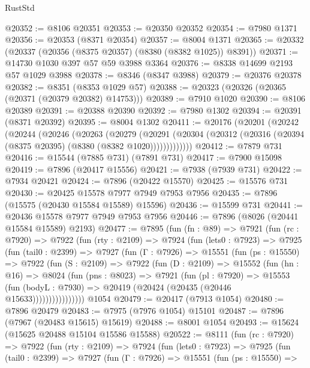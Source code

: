 \begin{lexlean}{RustStd}
\begin{coremodule}
@20352 := @8106 @20351
@20353 := @20350 @20352
@20354 := @7980 @1371
@20356 := @20353 (@8371 @20354)
@20357 := @8004 @1371
@20365 := @20332 (@20337 (@20356 (@8375 @20357) (@8380 (@8382 @1025)) @8391))
@20371 := @14730 @1030 @397 @57 @59 @3988 @3364
@20376 := @8338 @14699 @2193 @57 @1029 @3988
@20378 := @8346 (@8347 @3988)
@20379 := @20376 @20378
@20382 := @8351 (@8353 @1029 @57)
@20388 := @20323 (@20326 (@20365 (@20371 (@20379 @20382) @14753)))
@20389 := @7910 @1020
@20390 := @8106 @20389
@20391 := @20388 @20390
@20392 := @7980 @1302
@20394 := @20391 (@8371 @20392)
@20395 := @8004 @1302
@20411 := @20176
    (@20201
      (@20242
        (@20244
          (@20246
            (@20263
              (@20279
                (@20291
                  (@20304 (@20312 (@20316 (@20394 (@8375 @20395) (@8380 (@8382 @1020)))))))))))))
@20412 := @7879 @731
@20416 := @15544 (@7885 @731) (@7891 @731)
@20417 := @7900 @15098
@20419 := @7896 (@20417 @15556)
@20421 := @7938 (@7939 @731)
@20422 := @7934 @20421
@20424 := @7896 (@20422 @15570)
@20425 := @15576 @731
@20430 := @20425 @15578 @7977 @7949 @7953 @7956
@20435 := @7896 (@15575 (@20430 @15584 @15589) @15596)
@20436 := @15599 @731
@20441 := @20436 @15578 @7977 @7949 @7953 @7956
@20446 := @7896 (@8026 (@20441 @15584 @15589) @2193)
@20477 := @7895
    (fun (fn : @89) =>
    @7921
      (fun (rc : @7920) =>
      @7922
        (fun (rty : @2109) =>
        @7924
          (fun (lets0 : @7923) =>
          @7925
            (fun (tail0 : @2399) =>
            @7927
              (fun (Γ : @7926) =>
              @15551
                (fun (ps : @15550) =>
                @7922
                  (fun (S : @2109) =>
                  @7922
                    (fun (D : @2109) =>
                    @15552
                      (fun (hn : @16) =>
                      @8024
                        (fun (pns : @8023) =>
                        @7921
                          (fun (pl : @7920) =>
                          @15553
                            (fun (bodyL : @7930) =>
                            @20419 (@20424 (@20435 (@20446 @15633))))))))))))))))
    @1054
@20479 := @20417 (@7913 @1054)
@20480 := @7896 @20479
@20483 := @7975 (@7976 @1054) @15101
@20487 := @7896 (@7967 (@20483 @15615) @15619)
@20488 := @8001 @1054
@20493 := @15624 (@15625 @20488 @15104 @15586 @15588)
@20522 := @8111
    (fun (rc : @7920) =>
    @7922
      (fun (rty : @2109) =>
      @7924
        (fun (lets0 : @7923) =>
        @7925
          (fun (tail0 : @2399) =>
          @7927
            (fun (Γ : @7926) =>
            @15551
              (fun (ps : @15550) =>

\end{coremodule}
\end{lexlean}
